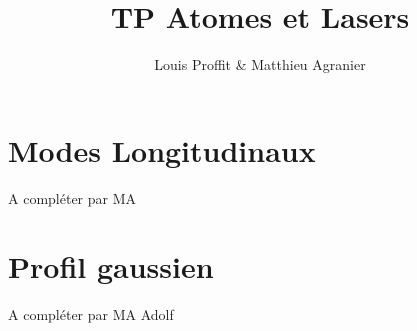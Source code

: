 \documentclass[a4paper,11pt,twoside]{article}
\title{TP Atomes et Lasers}
\author{Louis Proffit \& Matthieu Agranier }
\newcommand{\test}{Data here}
\renewcommand{\test}{Adolf}
\begin{document}
    \maketitle

    \section{Modes Longitudinaux}\label{sec:modes-longitudinaux}

    A compléter par MA


    \section{Profil gaussien}\label{sec:profil-gaussien}

    A compléter par MA
    \test{}
\end{document}
